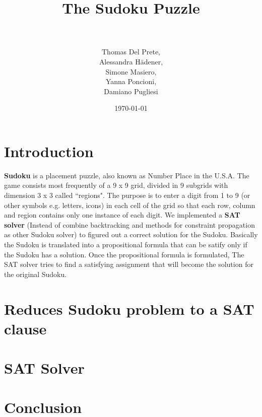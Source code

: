 \documentclass[paper=a4, fontsize=14pt]{scrartcl} %
\title{	
\huge The Sudoku Puzzle \\ %
\horrule{0.5pt} \\[0.5cm] %
}
\author{Thomas Del Prete, \\
		Alessandra H{\" a}dener, \\
		Simone Masiero, \\
		Yanna Poncioni, \\
		Damiano Pugliesi} %
\date{\normalsize\today} %
\begin{document}
	
	\maketitle
	
	\section*{Introduction}
	
		\textbf{Sudoku} is a placement puzzle, also known as Number Place in the U.S.A.
		\newline
		The game consists most frequently of a 9 x 9 grid, divided in 9 subgrids with dimension 3 x 3 called ``regions".
		\newline
		The purpose is to enter a digit from 1 to 9 (or other symbols e.g. letters, icons) in each cell of the grid so that each row, column and region contains only one instance of each digit.
		\newline
		We implemented a \textbf{SAT solver} (Instead of combine backtracking and methods for constraint propagation as other Sudoku solver) to figured out a correct solution for the Sudoku.
		\newline
		Basically the Sudoku is translated into a propositional formula that can be satify only if the Sudoku has a solution.
		\newline
		Once the propositional formula is formulated, The SAT solver tries to find a satisfying assignment that will become the solution for the original Sudoku.
			 			
	\section*{Reduces Sudoku problem to a SAT clause}
	
	\section*{SAT Solver}
	
	\section*{Conclusion}
	
	
\end{document}
